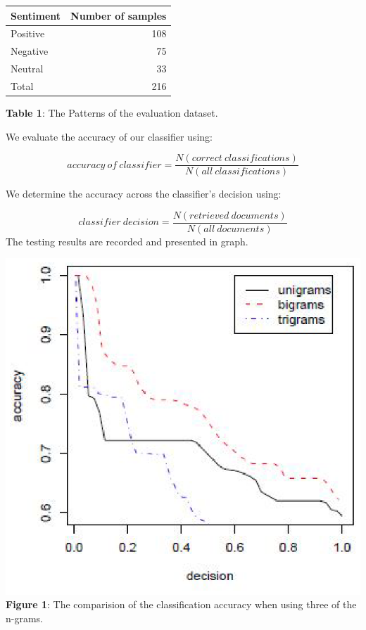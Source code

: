 \documentclass[a4paper,12pt]{article}
\begin{document}
\begin{center}
\begin{tabular}{|l|r|}
\hline
Sentiment & Number of samples\\
\hline
\hline
Positive & 108\\
Negative & 75\\
Neutral & 33\\
Total & 216\\
\hline
\end{tabular}
\linebreak
\linebreak 
\textbf{Table 1}: The Patterns of the evaluation dataset.
\end{center}

\begin{flushleft}
We evaluate the accuracy \cite{manning1999foundations} of our classifier using:
\end{flushleft}

\begin{equation}
accuracy\:of\:classifier= \frac{N(correct\:classifications)}{N(all\:classifications)}
\end{equation}

\begin{flushleft}
 We determine the accuracy across the classifier’s decision \cite{adda1998grace} using:
\end{flushleft} 

\begin{equation}
classifier\:decision = \frac{N(retrieved\:documents)}{N(all\:documents)}
\end{equation}
\linebreak
\linebreak
The testing results are recorded and presented in graph.

\begin{center}
\includegraphics[scale=0.5]{graph.eps}
\linebreak
\linebreak
\textbf{Figure 1}: The comparision of the classification accuracy when using three of the n-grams.
\end{center}
\end{document}
